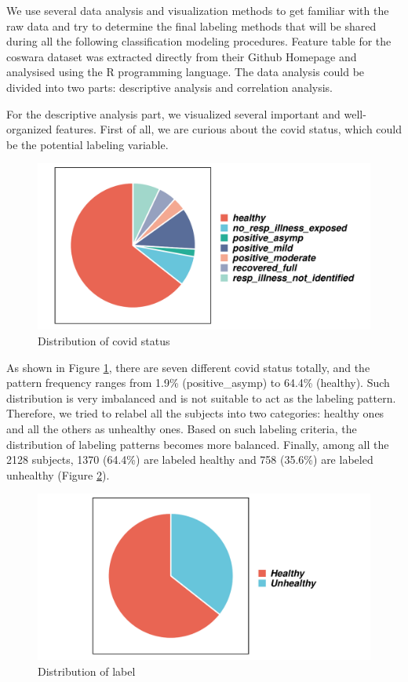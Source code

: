 \documentclass[11pt]{article}
\begin{document}
We use several data analysis and visualization methods to get familiar with the raw data and try to determine the final labeling methods that will be shared during all the following classification modeling procedures. Feature table for the coswara dataset was extracted directly from their Github Homepage and analysised using the R programming language. The data analysis could be divided into two parts: descriptive analysis and correlation analysis.

For the descriptive analysis part, we visualized several important and well-organized features. First of all, we are curious about the covid status, which could be the potential labeling variable.

\begin{figure}[!htbp]{}
    \centering
    \includegraphics[width=.8\textwidth]{./imgs/pie_covid_status.pdf} %
    \caption{Distribution of covid status}
    \label{fig:pie_covid_status}
\end{figure}

As shown in Figure \ref{fig:pie_covid_status}, there are seven different covid status totally, and the pattern frequency ranges from 1.9\% (positive\_asymp) to 64.4\% (healthy). Such distribution is very imbalanced and is not suitable to act as the labeling pattern. Therefore, we tried to relabel all the subjects into two categories: healthy ones and all the others as unhealthy ones. Based on such labeling criteria, the distribution of labeling patterns becomes more balanced. Finally, among all the 2128 subjects, 1370 (64.4\%) are labeled healthy and 758 (35.6\%) are labeled unhealthy (Figure \ref{fig:pie_label}).

\begin{figure}[htbp]{}
	\centering
    \includegraphics[width=.8\textwidth]{./imgs/pie_label.pdf} %
    \caption{Distribution of label}
    \label{fig:pie_label}
\end{figure}
\end{document}
